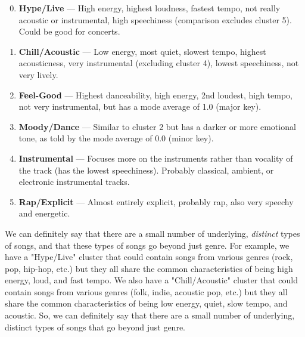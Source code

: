 \documentclass[11pt]{article}
\begin{document}
\begin{enumerate}
    \setcounter{enumi}{-1}
    \setlength{\parskip}{0pt}
    \item \textbf{Hype/Live} --- High energy, highest loudness, fastest tempo, not really acoustic or instrumental, high speechiness (comparison excludes cluster 5). Could be good for concerts.
    \item \textbf{Chill/Acoustic} --- Low energy, most quiet, slowest tempo, highest acousticness, very instrumental (excluding cluster 4), lowest speechiness, not very lively.
    \item \textbf{Feel-Good} --- Highest danceability, high energy, 2nd loudest, high tempo, not very instrumental, but has a mode average of 1.0 (major key).
    \item \textbf{Moody/Dance} --- Similar to cluster 2 but has a darker or more emotional tone, as told by the mode average of 0.0 (minor key).
    \item \textbf{Instrumental} --- Focuses more on the instruments rather than vocality of the track (has the lowest speechiness). Probably classical, ambient, or electronic instrumental tracks.
    \item \textbf{Rap/Explicit} --- Almost entirely explicit, probably rap, also very speechy and energetic.
\end{enumerate}

We can definitely say that there are a small number of underlying, \textit{distinct} types of songs, and that these types of songs go beyond just genre. For example, we have a "Hype/Live" cluster that could contain songs from various genres (rock, pop, hip-hop, etc.) but they all share the common characteristics of being high energy, loud, and fast tempo. We also have a "Chill/Acoustic" cluster that could contain songs from various genres (folk, indie, acoustic pop, etc.) but they all share the common characteristics of being low energy, quiet, slow tempo, and acoustic. So, we can definitely say that there are a small number of underlying, distinct types of songs that go beyond just genre.
\end{document}
